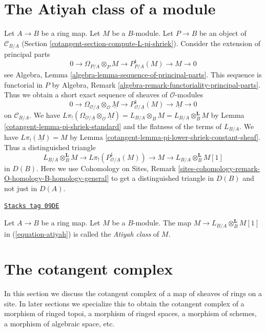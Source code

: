 \section{The Atiyah class of a module}
\label{cotangent-section-atiyah}
Let $A \to B$ be a ring map. Let $M$ be a $B$-module.
Let $P \to B$ be an object of $\mathcal{C}_{B/A}$
(Section \ref{cotangent-section-compute-L-pi-shriek}).
Consider the extension of principal parts
$$
0 \to \Omega_{P/A} \otimes_P M \to P^1_{P/A}(M) \to M \to 0
$$
see Algebra, Lemma \ref{algebra-lemma-sequence-of-principal-parts}.
This sequence is functorial in $P$ by
Algebra, Remark \ref{algebra-remark-functoriality-principal-parts}.
Thus we obtain a short exact sequence of sheaves of $\mathcal{O}$-modules
$$
0 \to \Omega_{\mathcal{O}/\underline{A}} \otimes_\mathcal{O} \underline{M} \to
P^1_{\mathcal{O}/\underline{A}}(M) \to \underline{M} \to 0
$$
on $\mathcal{C}_{B/A}$. We have
$L\pi_!(\Omega_{\mathcal{O}/\underline{A}} \otimes_\mathcal{O} \underline{M})
= L_{B/A} \otimes_B M = L_{B/A} \otimes_B^\mathbf{L} M$
by Lemma \ref{cotangent-lemma-pi-shriek-standard} and the flatness of
the terms of $L_{B/A}$.
We have $L\pi_!(\underline{M}) = M$ by
Lemma \ref{cotangent-lemma-pi-lower-shriek-constant-sheaf}.
Thus a distinguished triangle
\begin{equation}
\label{equation-atiyah}
L_{B/A} \otimes_B^\mathbf{L} M \to
L\pi_!\left(P^1_{\mathcal{O}/\underline{A}}(M)\right) \to M
\to L_{B/A} \otimes_B^\mathbf{L} M [1]
\end{equation}
in $D(B)$. Here we use Cohomology on Sites, Remark
\ref{sites-cohomology-remark-O-homology-B-homology-general}
to get a distinguished triangle in $D(B)$ and not just in $D(A)$.

\begin{definition}
\label{cotangent-definition-atiyah-class}
\href{https://stacks.math.columbia.edu/tag/09DE}{\texttt{Stacks tag 09DE}}

Let $A \to B$ be a ring map. Let $M$ be a $B$-module.
The map $M \to L_{B/A} \otimes_B^\mathbf{L} M[1]$
in (\ref{equation-atiyah}) is called the {\it Atiyah class} of $M$.
\end{definition}

\section{The cotangent complex}
\label{cotangent-section-cotangent-complex}
In this section we discuss the cotangent complex of a map of sheaves
of rings on a site. In later sections we specialize this to obtain
the cotangent complex of a morphism of ringed topoi, a morphism of
ringed spaces, a morphism of schemes, a morphism of algebraic space, etc.

